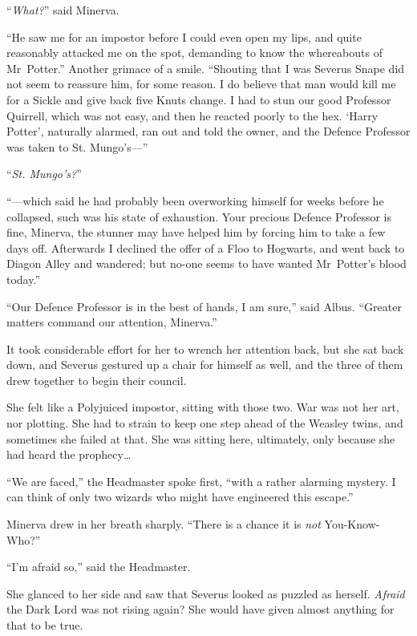 “\emph{What?}” said Minerva.

“He saw me for an impostor before I could even open my lips, and quite reasonably attacked me on the spot, demanding to know the whereabouts of Mr~Potter.” Another grimace of a smile. “Shouting that I was Severus Snape did not seem to reassure him, for some reason. I do believe that man would kill me for a Sickle and give back five Knuts change. I had to stun our good Professor Quirrell, which was not easy, and then he reacted poorly to the hex. ‘Harry Potter’, naturally alarmed, ran out and told the owner, and the Defence Professor was taken to St. Mungo’s—”

“\emph{St. Mungo’s?}”

“—which said he had probably been overworking himself for weeks before he collapsed, such was his state of exhaustion. Your precious Defence Professor is fine, Minerva, the stunner may have helped him by forcing him to take a few days off. Afterwards I declined the offer of a Floo to Hogwarts, and went back to Diagon Alley and wandered; but no-one seems to have wanted Mr~Potter’s blood today.”

“Our Defence Professor is in the best of hands, I am sure,” said Albus. “Greater matters command our attention, Minerva.”

It took considerable effort for her to wrench her attention back, but she sat back down, and Severus gestured up a chair for himself as well, and the three of them drew together to begin their council.

She felt like a Polyjuiced impostor, sitting with those two. War was not her art, nor plotting. She had to strain to keep one step ahead of the Weasley twins, and sometimes she failed at that. She was sitting here, ultimately, only because she had heard the prophecy…

“We are faced,” the Headmaster spoke first, “with a rather alarming mystery. I can think of only two wizards who might have engineered this escape.”

Minerva drew in her breath sharply. “There is a chance it is \emph{not} You-Know-Who?”

“I’m afraid so,” said the Headmaster.

She glanced to her side and saw that Severus looked as puzzled as herself. \emph{Afraid} the Dark Lord was not rising again? She would have given almost anything for that to be true.

